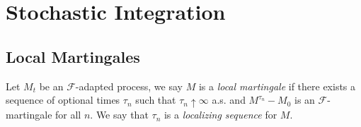 \section{Stochastic Integration}

\subsection{Local Martingales}

\begin{defn}Let $M_t$ be an $\mathcal{F}$-adapted process, we say $M$ is a \emph{local martingale} if there exists a sequence of optional times $\tau_n$ such that $\tau_n \uparrow \infty$ a.s. and $M^{\tau_n} - M_0$ is an $\mathcal{F}$-martingale for all $n$.  We say that $\tau_n$ is a \emph{localizing sequence} for $M$.
\end{defn}


